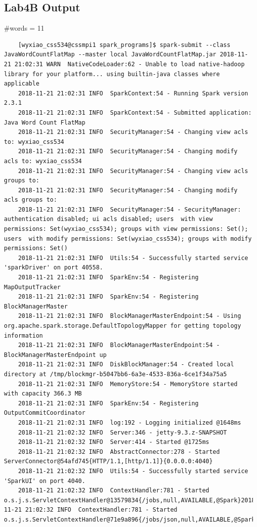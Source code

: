 \documentclass[11pt, letterpaper]{article}
\begin{document}
	\subsection{Lab4B Output}
	\noindent \#words = 11
	
	\begin{lstlisting}
	[wyxiao_css534@cssmpi1 spark_programs]$ spark-submit --class JavaWordCountFlatMap --master local JavaWordCountFlatMap.jar 2018-11-21 21:02:31 WARN  NativeCodeLoader:62 - Unable to load native-hadoop library for your platform... using builtin-java classes where applicable
	2018-11-21 21:02:31 INFO  SparkContext:54 - Running Spark version 2.3.1
	2018-11-21 21:02:31 INFO  SparkContext:54 - Submitted application: Java Word Count FlatMap
	2018-11-21 21:02:31 INFO  SecurityManager:54 - Changing view acls to: wyxiao_css534
	2018-11-21 21:02:31 INFO  SecurityManager:54 - Changing modify acls to: wyxiao_css534
	2018-11-21 21:02:31 INFO  SecurityManager:54 - Changing view acls groups to:
	2018-11-21 21:02:31 INFO  SecurityManager:54 - Changing modify acls groups to:
	2018-11-21 21:02:31 INFO  SecurityManager:54 - SecurityManager: authentication disabled; ui acls disabled; users  with view permissions: Set(wyxiao_css534); groups with view permissions: Set(); users  with modify permissions: Set(wyxiao_css534); groups with modify permissions: Set()
	2018-11-21 21:02:31 INFO  Utils:54 - Successfully started service 'sparkDriver' on port 40558.
	2018-11-21 21:02:31 INFO  SparkEnv:54 - Registering MapOutputTracker
	2018-11-21 21:02:31 INFO  SparkEnv:54 - Registering BlockManagerMaster
	2018-11-21 21:02:31 INFO  BlockManagerMasterEndpoint:54 - Using org.apache.spark.storage.DefaultTopologyMapper for getting topology information
	2018-11-21 21:02:31 INFO  BlockManagerMasterEndpoint:54 - BlockManagerMasterEndpoint up
	2018-11-21 21:02:31 INFO  DiskBlockManager:54 - Created local directory at /tmp/blockmgr-b5047bb6-6a3e-4533-836a-6ce1f34a75a5
	2018-11-21 21:02:31 INFO  MemoryStore:54 - MemoryStore started with capacity 366.3 MB
	2018-11-21 21:02:31 INFO  SparkEnv:54 - Registering OutputCommitCoordinator
	2018-11-21 21:02:31 INFO  log:192 - Logging initialized @1648ms
	2018-11-21 21:02:32 INFO  Server:346 - jetty-9.3.z-SNAPSHOT
	2018-11-21 21:02:32 INFO  Server:414 - Started @1725ms
	2018-11-21 21:02:32 INFO  AbstractConnector:278 - Started ServerConnector@54afd745{HTTP/1.1,[http/1.1]}{0.0.0.0:4040}
	2018-11-21 21:02:32 INFO  Utils:54 - Successfully started service 'SparkUI' on port 4040.
	2018-11-21 21:02:32 INFO  ContextHandler:781 - Started o.s.j.s.ServletContextHandler@13579834{/jobs,null,AVAILABLE,@Spark}2018-11-21 21:02:32 INFO  ContextHandler:781 - Started o.s.j.s.ServletContextHandler@71e9a896{/jobs/json,null,AVAILABLE,@Spark}

\end{lstlisting}
\end{document}
